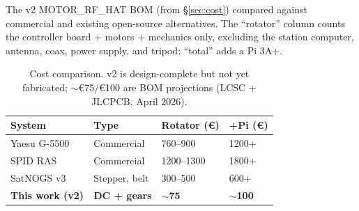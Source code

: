 The v2 MOTOR\_RF\_HAT BOM (from \S\ref{sec:cost}) compared against commercial and existing open-source alternatives. The ``rotator'' column counts the controller board + motors + mechanics only, excluding the station computer, antenna, coax, power supply, and tripod; ``total'' adds a Pi 3A+.

\begin{table}[H]
    \centering
    \small
    \begin{tabular}{@{}llll@{}}
        \toprule
        System & Type & Rotator (\euro{}) & +Pi (\euro{}) \\
        \midrule
        Yaesu G-5500   & Commercial    & 760--900   & 1200+ \\
        SPID RAS       & Commercial    & 1200--1300 & 1800+ \\
        SatNOGS v3     & Stepper, belt & 300--500   & 600+ \\
        \textbf{This work (v2)} & \textbf{DC + gears} & \textbf{$\sim$75} & \textbf{$\sim$100} \\
        \bottomrule
    \end{tabular}
    \caption{Cost comparison. v2 is design-complete but not yet fabricated; $\sim$\euro{}75/\euro{}100 are BOM projections (LCSC + JLCPCB, April 2026).}
\end{table}
